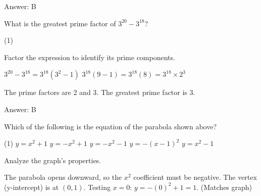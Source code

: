\documentclass[11pt,paper=a4,answers]{exam}
\begin{document}
\begin{questions}
\begin{solution}
Answer: \colorbox{yellow!100}{B}
\end{solution}

\vspace{1cm}

\question
What is the greatest prime factor of $3^{20} - 3^{18}$?

\begin{tasks}(1)
    
\end{tasks}

\begin{solution}
Factor the expression to identify its prime components.
\vspace{5pt}
\begin{center}
$3^{20} - 3^{18} = 3^{18}(3^2 - 1)$
\vspace{5pt}
$3^{18}(9 - 1) = 3^{18}(8) = 3^{18} \times 2^3$
\end{center}
\vspace{5pt}
The prime factors are 2 and 3. The greatest prime factor is 3.

Answer: \colorbox{yellow!100}{B}
\end{solution}

\vspace{1cm}

\question
\begin{center}
\end{center}
Which of the following is the equation of the parabola shown above?

\begin{tasks}(1)
\task[A)] $y = x^2 + 1$ \task[B)] $y = -x^2 + 1$ \task[C)] $y = -x^2 - 1$ \task[D)] $y = -(x-1)^2$ \task[E)] $y = x^2 - 1$
\end{tasks}

\begin{solution}
Analyze the graph's properties.
\vspace{5pt}
\begin{center}
The parabola opens downward, so the $x^2$ coefficient must be negative.
\vspace{5pt}
The vertex (y-intercept) is at $(0, 1)$.
\vspace{5pt}
Testing $x=0$: $y = -(0)^2 + 1 = 1$. (Matches graph)
\end{center}


\end{solution}
\end{questions}
\end{document}
